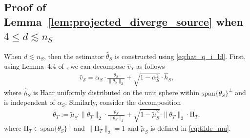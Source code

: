 \documentclass[10pt]{article}
\newcommand{\wh}{\widehat}
\newcommand{\wt}{\widetilde}
\renewcommand{\sp}{\mathrm{span}}
\newcommand{\trg}{T}
\newcommand{\thetaT}{\theta_{\trg}}
\newcommand{\calS}{\mathcal S}
\newcommand{\src}{S}
\newcommand{\thetaS}{\theta_{\src}}
\newcommand{\nS}{n_{\src}}
\begin{document}
\subsection{Proof of Lemma~\ref{lem:projected_diverge_source} when $4 \le d \lesssim \nS$}
\label{sec:proof_s_6_d_ll_n}
When $d \lesssim \nS$, then the estimator $\wh{\theta}_\src$ is constructed using \eqref{eq:hat_q_i_ld}. First, using Lemma~4.4 of \citet{LofflerZhangZhou2021}, we can decompose $\wh v_\calS$ as follows
\begin{align}
    \label{eq:haar_decomp_ld}
    \wh v_\calS = \alpha_\src \cdot \frac{\thetaS}{\|\thetaS\|_2} + \sqrt{1-\alpha^2_\src} \cdot \wh h_\src,
\end{align}
where $\wh h_\src$ is Haar uniformly distributed on the unit sphere within $\sp\{\thetaS\}^\perp$ and is independent of $\alpha_\src$. Similarly, consider the decomposition
\begin{align}
\label{eq:mu_wise_decomp}
    \thetaT:= \wt\mu_\src\cdot\|\thetaT\|_2\cdot \frac{\thetaS}{\|\thetaS\|_2}+\sqrt{1-\wt\mu^2_\src}\cdot \|\thetaT\|_2 \cdot \mathrm H_\trg,
\end{align}
where $\mathrm H_\trg \in \sp\{\thetaS\}^\perp$ and $\|\mathrm H_\trg\|_2=1$ and $\wt \mu_\src$ is defined in \eqref{eq:tilde_mu}.
\end{document}
